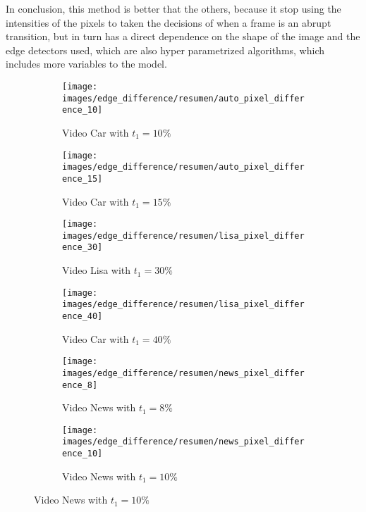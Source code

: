 \documentclass[journal]{IEEEtran}
\begin{document}
In conclusion, this method is better that the others, because it stop using the intensities of the pixels to taken the decisions of when a frame is an abrupt transition, but in turn has a direct dependence on the shape of the image and the edge detectors used, which are also hyper parametrized algorithms, which includes more variables to the model.


\begin{figure}
	\centering
	\begin{subfigure}{0.23\textwidth}
		\centering
		\texttt{[image: images/edge\_difference/resumen/auto\_pixel\_difference\_10]} 
		\caption{Video Car with $t_1 = 10\%$}
		\label{fig:edge_difference:resumen:car_10} 
	\end{subfigure}
	\centering
	\begin{subfigure}{0.23\textwidth}
		\centering
		\texttt{[image: images/edge\_difference/resumen/auto\_pixel\_difference\_15]} 
		\caption{Video Car with $t_1 = 15\%$}
		\label{fig:edge_difference:resumen:car_15} 
	\end{subfigure}
	
	\centering
	\begin{subfigure}{0.23\textwidth}
		\centering
		\texttt{[image: images/edge\_difference/resumen/lisa\_pixel\_difference\_30]} 
		\caption{Video Lisa with $t_1 = 30\%$}
		\label{fig:edge_difference:resumen:lisa_30} 
	\end{subfigure}
	\centering
	\begin{subfigure}{0.23\textwidth}
		\centering
		\texttt{[image: images/edge\_difference/resumen/lisa\_pixel\_difference\_40]} 
		\caption{Video Car with $t_1 = 40\%$}
		\label{fig:edge_difference:resumen:lisa_40} 
	\end{subfigure}
	
	\centering
	\begin{subfigure}{0.23\textwidth}
		\centering
		\texttt{[image: images/edge\_difference/resumen/news\_pixel\_difference\_8]} 
		\caption{Video News with $t_1 = 8\%$}
		\label{fig:edge_difference:resumen:news_8} 
	\end{subfigure}
	\centering
	\begin{subfigure}{0.23\textwidth}
		\centering
		\texttt{[image: images/edge\_difference/resumen/news\_pixel\_difference\_10]} 
		\caption{Video News with $t_1 = 10\%$}
		\label{fig:edge_difference:resumen:news_10} 
	\end{subfigure}
	

\end{figure}
\end{document}
